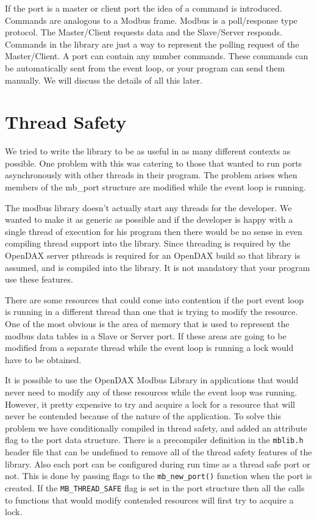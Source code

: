 \documentclass[10pt,letterpaper]{report}
\begin{document}
If the port is a master or client port the idea of a command is introduced.  Commands are analogous to a Modbus frame.  Modbus is a poll/response type protocol.  The Master/Client requests data and the Slave/Server responds.  Commands in the library are just a way to represent the polling request of the Master/Client.  A port can contain any number commands.  These commands can be automatically sent from the event loop, or your program can send them manually.  We will discuss the details of all this later.

\section{Thread Safety}

We tried to write the library to be as useful in as many different contexts as possible.  One problem with this was catering to those that wanted to run ports asynchronously with other threads in their program.  The problem arises when members of the mb\_port structure are modified while the event loop is running.

The modbus library doesn't actually start any threads for the developer.  We wanted to make it as generic as possible and if the developer is happy with a single thread of execution for his program then there would be no sense in even compiling thread support into the library.  Since threading is required by the OpenDAX server pthreads is required for an OpenDAX build so that library is assumed, and is compiled into the library.  It is not mandatory that your program use these features.

There are some resources that could come into contention if the port event loop is running in a different thread than one that is trying to modify the resource. One of the most obvious is the area of memory that is used to represent the modbus data tables in a Slave or Server port.  If these areas are going to be modified from a separate thread while the event loop is running a lock would have to be obtained. 

It is possible to use the OpenDAX Modbus Library in applications that would never need to modify any of these resources while the event loop was running.  However, it  pretty expensive to try and acquire a lock for a resource that will never be contended because of the nature of the application.  To solve this problem we have conditionally compiled in thread safety, and added an attribute flag to the port data structure.  There is a precompiler definition in the \texttt{mblib.h} header file that can be undefined to remove all of the thread safety features of the library.  Also each port can be configured during run time as a thread safe port or not.  This is done by passing flags to the \texttt{mb\_new\_port()} function when the port is created.  If the \texttt{MB\_THREAD\_SAFE} flag is set in the port structure then all the calls to functions that would modify contended resources will first try to acquire a lock.
\end{document}
